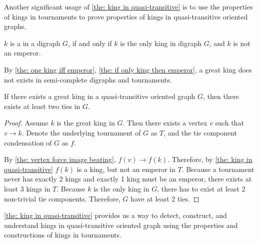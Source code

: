 Another significant usage of \cref{the: king in quasi-transitive}
is to use the properties of kings in tournaments to prove
properties of kings in quasi-transitive oriented graphs.

\begin{definition}
  \(k\) is a  in a digraph \(G\),
  if and only if \(k\) is the only king in digraph \(G\),
  and \(k\) is not an emperor.
\end{definition}

By \cref{the: one king iff emperor},
\cref{the: if only king then emperor},
a great king does not exists in semi-complete digraphs and
tournaments.

\begin{corollary}
  If there exists a great king in a
  quasi-transitive oriented graph \(G\),
  then there exists at least two ties in \(G\).
\end{corollary}

\begin{proof}
  Assume \(k\) is the great king in \(G\).
  Then there exists a vertex  \(v\) such that \(v \to k\).
  Denote the underlying tournament of \(G\) as \(T\),
  and the tie component condensation of \(G\) as \(f\).

  By \cref{the: vertex force image beating}, \(f(v) \to f(k)\).
  Therefore, by \cref{the: king in quasi-transitive}
  \(f(k)\) is a king, but not an emperor in \(T\).
  Because a tournament never has exactly 2 kings
  and exactly 1 king must be an emperor,
  there exists at least 3 kings in \(T\).
  Because \(k\) is the only king in \(G\),
  there has to exist at least 2 non-trivial tie components.
  Therefore, \(G\) have at least 2 ties.
\end{proof}

\cref{the: king in quasi-transitive}
provides us a way to detect, construct, and understand kings
in quasi-transitive oriented graph using
the properties and constructions of kings in tournaments.
